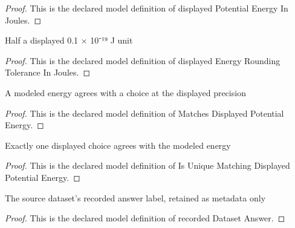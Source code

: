 \begin{proof}
  This is the declared model definition of displayed Potential Energy In Joules.
\end{proof}
\begin{definition}
  \label{def:physics:phyx-mini-0854:phyxminiproblems-problemphyxmini0854-displayedenergyroundingtoleranceinjoules}
  Half a displayed 0.1 × 10⁻¹⁹ J unit
\end{definition}
\begin{proof}
  This is the declared model definition of displayed Energy Rounding Tolerance In Joules.
\end{proof}
\begin{definition}
  \label{def:physics:phyx-mini-0854:phyxminiproblems-problemphyxmini0854-matchesdisplayedpotentialenergy}
  A modeled energy agrees with a choice at the displayed precision
\end{definition}
\begin{proof}
  This is the declared model definition of Matches Displayed Potential Energy.
\end{proof}
\begin{definition}
  \label{def:physics:phyx-mini-0854:phyxminiproblems-problemphyxmini0854-isuniquematchingdisplayedpotentialenergy}
  Exactly one displayed choice agrees with the modeled energy
\end{definition}
\begin{proof}
  This is the declared model definition of Is Unique Matching Displayed Potential Energy.
\end{proof}
\begin{definition}
  \label{def:physics:phyx-mini-0854:phyxminiproblems-problemphyxmini0854-recordeddatasetanswer}
  The source dataset's recorded answer label, retained as metadata only
\end{definition}
\begin{proof}
  This is the declared model definition of recorded Dataset Answer.
\end{proof}
